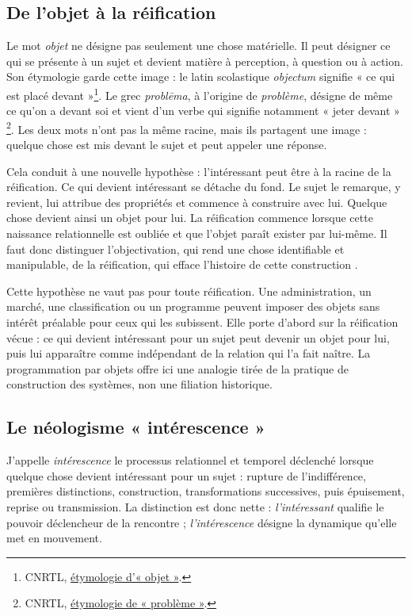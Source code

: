 \documentclass[11pt,a4paper]{article}
\begin{document}
\subsection{De l'objet à la réification}

Le mot \emph{objet} ne désigne pas seulement une chose matérielle. Il peut
désigner ce qui se présente à un sujet et devient matière à perception, à
question ou à action. Son étymologie garde cette image : le latin scolastique
\emph{objectum} signifie « ce qui est placé devant »\footnote{CNRTL,
\href{https://www.cnrtl.fr/etymologie/objet}{étymologie d'« objet »}.}.
Le grec \emph{problēma}, à l'origine de \emph{problème}, désigne de même ce
qu'on a devant soi et vient d'un verbe qui signifie notamment « jeter devant »
\footnote{CNRTL,
\href{https://www.cnrtl.fr/etymologie/probleme}{étymologie de
« problème »}.}. Les deux mots n'ont pas la même racine, mais ils partagent
une image : quelque chose est mis devant le sujet et peut appeler une réponse.

Cela conduit à une nouvelle hypothèse : l'intéressant peut être à la racine de
la réification. Ce qui devient intéressant se détache du fond. Le sujet le
remarque, y revient, lui attribue des propriétés et commence à construire avec
lui. Quelque chose devient ainsi un objet pour lui. La réification commence
lorsque cette naissance relationnelle est oubliée et que l'objet paraît exister
par lui-même. Il faut donc distinguer l'objectivation, qui rend une chose
identifiable et manipulable, de la réification, qui efface l'histoire de cette
construction \parencite{pachet2004reification}.

Cette hypothèse ne vaut pas pour toute réification. Une administration, un
marché, une classification ou un programme peuvent imposer des objets sans
intérêt préalable pour ceux qui les subissent. Elle porte d'abord sur la
réification vécue : ce qui devient intéressant pour un sujet peut devenir un
objet pour lui, puis lui apparaître comme indépendant de la relation qui l'a
fait naître. La programmation par objets offre ici une analogie tirée de la
pratique de construction des systèmes, non une filiation historique.

\subsection{Le néologisme « intérescence »}

J'appelle \emph{intérescence} le processus relationnel et temporel déclenché
lorsque quelque chose devient intéressant pour un sujet : rupture de
l'indifférence, premières distinctions, construction, transformations
successives, puis épuisement, reprise ou transmission. La distinction est donc
nette : \emph{l'intéressant} qualifie le pouvoir déclencheur de la rencontre ;
\emph{l'intérescence} désigne la dynamique qu'elle met en mouvement.
\end{document}
